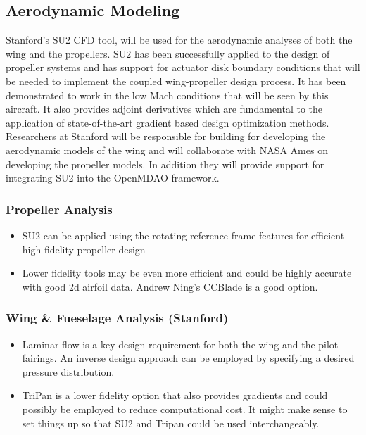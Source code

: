 \documentclass[]{aiaa-tc}
\begin{document}
    \subsection{Aerodynamic Modeling}

    Stanford's SU2 CFD tool, will be used for the aerodynamic analyses of both the wing and 
    the propellers. SU2 has been successfully applied to the design of propeller systems 
    and has support for actuator disk boundary conditions that will be needed to implement 
    the coupled wing­-propeller design process. It has been demonstrated to work in the low 
    Mach conditions that will be seen by this aircraft. It also provides adjoint derivatives 
    which are fundamental to the application of state-of-the-art gradient based design 
    optimization methods. Researchers at Stanford will be responsible for building for developing 
    the aerodynamic models of the wing and will collaborate with NASA Ames on developing the 
    propeller models. In addition they will provide support for integrating SU2 into the OpenMDAO 
    framework. 

    \subsubsection{Propeller Analysis}
        \begin{itemize}
            \item SU2 can be applied using the rotating reference frame features for efficient high fidelity propeller design
            \item Lower fidelity tools may be even more efficient and could be highly accurate with good 2d airfoil data. Andrew Ning's 
            CCBlade is a good option. 
        \end{itemize}

    \subsubsection{Wing \& Fueselage Analysis (Stanford)}
        \begin{itemize}
            \item Laminar flow is a key design requirement for both the wing and the pilot fairings. An inverse design approach can be employed 
            by specifying a desired pressure distribution. 
            \item TriPan is a lower fidelity option that also provides gradients and could possibly be employed to reduce computational cost. It might make sense to set things up so that SU2 and Tripan could be used interchangeably. 
        \end{itemize}
\end{document}
